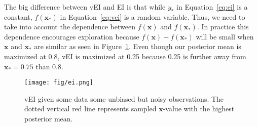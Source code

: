 The big difference between vEI and EI is that while $y_*$ in Equation~\ref{eq:ei} is a constant, $f(\mathbf{x}_*)$ in Equation~\ref{eq:vei} is a random variable.
Thus, we need to take into account the dependence between $f(\mathbf{x})$ and $f(\mathbf{x}_*)$.
In practice this dependence encourages exploration because $f(\mathbf{x}) - f(\mathbf{x}_*)$ will be small when $\mathbf{x}$ and $\mathbf{x}_*$ are similar as seen in Figure~\ref{fig:ei}.
Even though our posterior mean is maximized at 0.8, vEI is maximized at 0.25 because 0.25 is further away from $\mathbf{x}_* = 0.75$ than 0.8.

\begin{figure}[t]
    \centering
    \texttt{[image: fig/ei.png]}
    \caption{vEI given some data some unbiased but noisy observations.
        The dotted vertical red line represents sampled $\mathbf{x}$-value with the highest posterior mean.
    }
    \label{fig:ei}

\end{figure}


